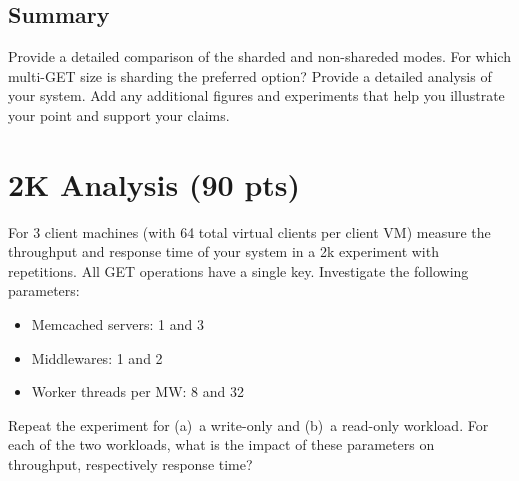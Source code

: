 \documentclass[11pt,a4paper]{article}
\begin{document}
\subsection{Summary}

Provide a detailed comparison of the sharded and non-shareded modes. For which multi-GET size is sharding the preferred option? Provide a detailed analysis of your system. Add any additional figures and experiments that help you illustrate your point and support your claims.

\section{2K Analysis (90 pts)}

For 3 client machines (with 64 total virtual clients per client VM) measure the throughput and response time of your system in a 2k experiment with repetitions. All GET operations have a single key. Investigate the following parameters:

\begin{itemize}
		
	\item Memcached servers: 1 and 3
	\item Middlewares: 1 and 2
	\item Worker threads per MW: 8 and 32
	      	      
\end{itemize}

Repeat the experiment for (a)~a write-only and (b)~a read-only workload.
For each of the two workloads, what is the impact of these parameters on throughput, respectively response time?
\end{document}
